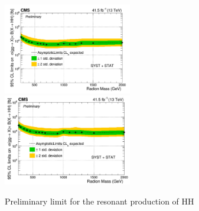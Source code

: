 \begin{figure}[htb]
  \centering
  \includegraphics[width=0.5\textwidth]{Images/ResonantHH/Ram_HiggGGMeeting_August2020_WW.jpeg.pdf}%
  \includegraphics[width=0.5\textwidth]{Images/ResonantHH/Ram_HiggGGMeeting_August2020_ZZ.jpeg.pdf}
\caption{Preliminary limit for the resonant production of HH} \label{fig:diagram}
\end{figure}
